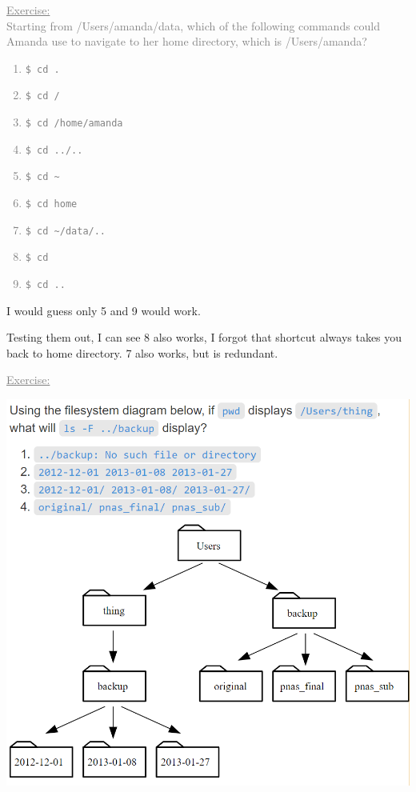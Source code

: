\documentclass[12pt]{article}
\begin{document}
\vspace{0.5em}
\begin{addmargin}[1cm]{0cm}
\textcolor{gray}{\underline{Exercise:}\vspace{0.5em}\\Starting from /Users/amanda/data, which of the following commands could Amanda use to navigate to her home directory, which is /Users/amanda?
\begin{enumerate}
    \item \texttt{\$ cd .}
    \item \texttt{\$ cd /}
    \item \texttt{\$ cd /home/amanda}
    \item \texttt{\$ cd ../..}
    \item \texttt{\$ cd \textasciitilde}
    \item \texttt{\$ cd home}
    \item \texttt{\$ cd \textasciitilde/data/..}
    \item \texttt{\$ cd}
    \item \texttt{\$ cd ..}
\end{enumerate}}

I would guess only 5 and 9 would work. 

Testing them out, I can see 8 also works, I forgot that shortcut always takes you back to home directory. 7 also works, but is redundant.

\vspace{0.5em}
\textcolor{gray}{\underline{Exercise:}}
\begin{center}
\includegraphics[scale=1]{imgrelativepathresolution.PNG}
\end{center}


\end{addmargin}
\end{document}
